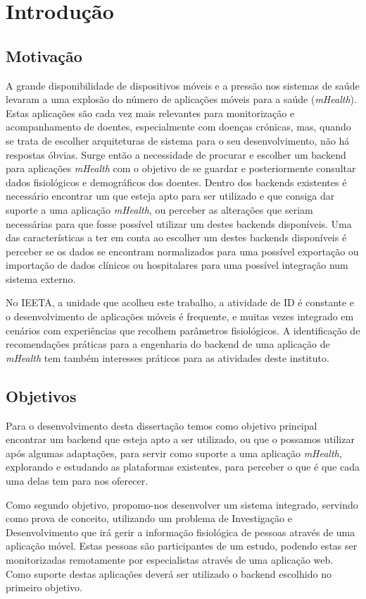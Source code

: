 \chapter{Introdu\c c\~ao}

\section{Motivação}

A grande disponibilidade de dispositivos móveis e a pressão nos sistemas de saúde levaram a uma explosão do número de aplicações móveis para a saúde (\textit{mHealth}). Estas aplicações são cada vez mais relevantes para monitorização e acompanhamento de doentes, especialmente com doenças crónicas, mas, quando se trata de escolher arquiteturas de sistema para o seu desenvolvimento, não há respostas óbvias. Surge então a necessidade de procurar e escolher um backend para aplicações \textit{mHealth} com o objetivo de se guardar e posteriormente consultar dados fisiológicos e demográficos dos doentes.
Dentro dos backends existentes é necessário encontrar um que esteja apto para ser utilizado e que consiga dar suporte a uma aplicação \textit{mHealth}, ou perceber as alterações que seriam necessárias para que fosse possível utilizar um destes backends disponíveis. Uma das características a ter em conta ao escolher um destes backends disponíveis é perceber se os dados se encontram normalizados para uma possível exportação ou importação de dados clínicos ou hospitalares para uma possível integração num sistema externo. \par
No \gls{IEETA}, a unidade que acolheu este trabalho, a atividade de \gls{ID} é constante e o desenvolvimento de aplicações móveis é frequente, e muitas vezes integrado em cenários com experiências que recolhem parâmetros fisiológicos. A identificação de recomendações práticas para a engenharia do backend de uma aplicação de \textit{mHealth} tem também interesses práticos para as atividades deste instituto.

\section{Objetivos}
Para o desenvolvimento desta dissertação temos como objetivo principal encontrar um backend que esteja apto a ser utilizado, ou que o possamos utilizar após algumas adaptações, para servir como suporte a uma aplicação \textit{mHealth}, explorando e estudando as plataformas existentes, para perceber o que é que cada uma delas tem para nos oferecer. \par
Como segundo objetivo, propomo-nos desenvolver um sistema integrado, servindo como prova de conceito, utilizando um problema de Investigação e Desenvolvimento que irá gerir a informação fisiológica de pessoas através de uma aplicação móvel. Estas pessoas são participantes de um estudo, podendo estas ser monitorizadas remotamente por especialistas através de uma aplicação web. Como suporte destas aplicações deverá ser utilizado o backend escolhido no primeiro objetivo.
\cleardoublepage